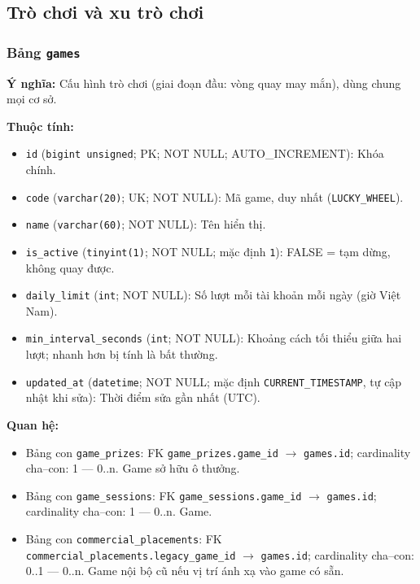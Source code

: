 \subsection{Trò chơi và xu trò chơi}

\subsubsection{Bảng \texttt{games}}

\textbf{Ý nghĩa:} Cấu hình trò chơi (giai đoạn đầu: vòng quay may mắn), dùng chung mọi cơ sở.\par

\textbf{Thuộc tính:}

\begin{itemize}

\item \texttt{id} (\texttt{bigint unsigned}; PK; NOT NULL; AUTO_INCREMENT): Khóa chính.

\item \texttt{code} (\texttt{varchar(20)}; UK; NOT NULL): Mã game, duy nhất (\texttt{LUCKY\_WHEEL}).

\item \texttt{name} (\texttt{varchar(60)}; NOT NULL): Tên hiển thị.

\item \texttt{is\_active} (\texttt{tinyint(1)}; NOT NULL; mặc định \texttt{1}): FALSE = tạm dừng, không quay được.

\item \texttt{daily\_limit} (\texttt{int}; NOT NULL): Số lượt mỗi tài khoản mỗi ngày (giờ Việt Nam).

\item \texttt{min\_interval\_seconds} (\texttt{int}; NOT NULL): Khoảng cách tối thiểu giữa hai lượt; nhanh hơn bị tính là bất thường.

\item \texttt{updated\_at} (\texttt{datetime}; NOT NULL; mặc định \texttt{CURRENT\_TIMESTAMP}, tự cập nhật khi sửa): Thời điểm sửa gần nhất (UTC).

\end{itemize}

\textbf{Quan hệ:}

\begin{itemize}

\item Bảng con \texttt{game\_prizes}: FK \texttt{game\_prizes.game\_id} $\rightarrow$ \texttt{games.id}; cardinality cha--con: 1 — 0..n. Game sở hữu ô thưởng.

\item Bảng con \texttt{game\_sessions}: FK \texttt{game\_sessions.game\_id} $\rightarrow$ \texttt{games.id}; cardinality cha--con: 1 — 0..n. Game.

\item Bảng con \texttt{commercial\_placements}: FK \texttt{commercial\_placements.legacy\_game\_id} $\rightarrow$ \texttt{games.id}; cardinality cha--con: 0..1 — 0..n. Game nội bộ cũ nếu vị trí ánh xạ vào game có sẵn.

\end{itemize}

